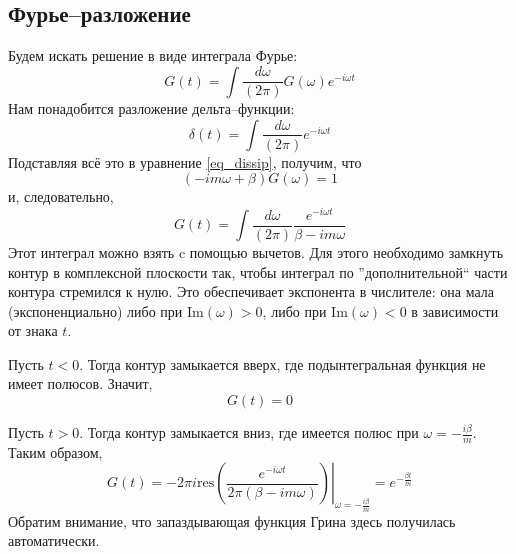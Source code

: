 \documentclass{article}
\begin{document}
\subsection{Фурье--разложение}
Будем искать решение в виде интеграла Фурье:
\begin{equation}
    G(t) = \int \frac{d\omega}{(2\pi)} G(\omega) e^{-i\omega t}
\end{equation}
Нам понадобится разложение дельта--функции:
\begin{equation}
    \delta(t) = \int \frac{d\omega}{(2\pi)} e^{-i\omega t}
\end{equation}
Подставляя всё это в уравнение \eqref{eq_dissip}, получим, что
\begin{equation}
    (-im\omega + \beta) G(\omega) = 1
\end{equation}
и, следовательно,
\begin{equation}
    G(t) = \int \frac{d\omega}{(2\pi)} \frac{e^{-i\omega t}}{\beta - im\omega}
\end{equation}
Этот интеграл можно взять c помощью вычетов. Для этого необходимо замкнуть
контур в комплексной плоскости так, чтобы интеграл по ''дополнительной`` части контура
стремился к нулю. Это обеспечивает экспонента в числителе: она мала (экспоненциально) либо 
при $\mathrm{Im}(\omega) > 0$, либо при $\mathrm{Im}(\omega) < 0$ в зависимости от знака
$t$.

Пусть $t < 0$. Тогда контур замыкается вверх, где подынтегральная функция не имеет полюсов.
Значит, 
\begin{equation}
    G(t) = 0 
\end{equation}

Пусть $t > 0$. Тогда контур замыкается вниз, где имеется полюс при 
$\omega = -\frac{i\beta}{m}$. 
Таким образом,
\begin{equation}
    G(t) = -2\pi i \left. \mathrm{res}\left(\frac{e^{-i\omega t}}{2\pi(\beta - im\omega)}\right)
                   \right|_{\omega = -\frac{i\beta}{m}}  = e^{-\frac{\beta t}{m}}
\end{equation}
Обратим внимание, что запаздывающая функция Грина здесь получилась автоматически.
\end{document}
